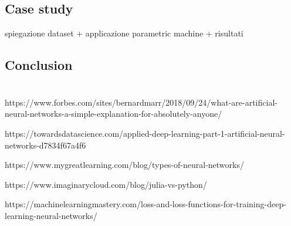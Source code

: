 \documentclass{article}
\begin{document}
\section{Case study}
spiegazione dataset + applicazione parametric machine + risultati

\section{Conclusion}

  
\chapter{}





\begin{thebibliography}{9}





https://www.forbes.com/sites/bernardmarr/2018/09/24/what-are-artificial-neural-networks-a-simple-explanation-for-absolutely-anyone/

https://towardsdatascience.com/applied-deep-learning-part-1-artificial-neural-networks-d7834f67a4f6

https://www.mygreatlearning.com/blog/types-of-neural-networks/

https://www.imaginarycloud.com/blog/julia-vs-python/

https://machinelearningmastery.com/loss-and-loss-functions-for-training-deep-learning-neural-networks/


 \end{thebibliography}
    

\end{document}
